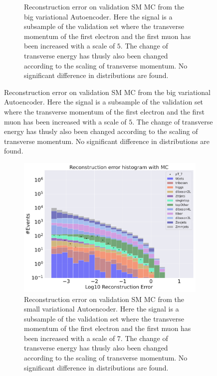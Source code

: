 \begin{figure}[h!]
\begin{subfigure}{.45\textwidth}
        \caption{Reconstruction error on validation SM MC from the big variational Autoencoder. Here the signal is a subsample of the validation 
        set where the transverse momentum of the first electron and the first muon has been increased with a scale of $5$. The change of transverse 
        energy has thusly also been changed according to the scaling of transverse momentum. No significant difference in distributions are found. }
        \label{fig:ae_big_pt_5}
    \end{subfigure}
    \hfill 
    \label{fig:ae_big_small_pt_5}
\end{figure}


\begin{figure}[h!]
    \centering
    \begin{subfigure}{.45\textwidth}
        \includegraphics[width=\textwidth]{Figures/AE_testing/small/b_data_recon_big_rm3_feats_sig_pT_7.pdf}
        \caption{Reconstruction error on validation SM MC from the small variational Autoencoder. Here the signal is a subsample of the validation 
        set where the transverse momentum of the first electron and the first muon has been increased with a scale of $7$. The change of transverse 
        energy has thusly also been changed according to the scaling of transverse momentum. No significant difference in distributions are found. }
        \label{fig:ae_small_pt_7}
    \end{subfigure}
    \hfill 
    \begin{subfigure}{.45\textwidth}

\end{subfigure}
\end{figure}
